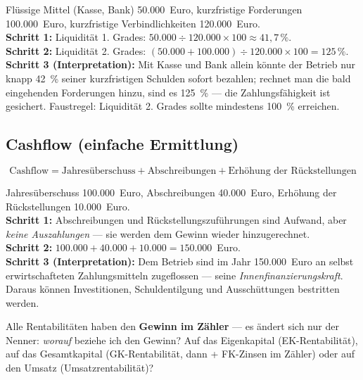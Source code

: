 \documentclass[11pt, a4paper]{article}
\begin{document}
\begin{beispiel}[title={Beispiel: Liquidität 1. und 2. Grades}]
Flüssige Mittel (Kasse, Bank) 50.000~Euro, kurzfristige Forderungen 100.000~Euro,
kurzfristige Verbindlichkeiten 120.000~Euro.\\
\textbf{Schritt 1:} Liquidität 1. Grades: $50.000 \div 120.000 \times 100
\approx 41{,}7\,\%$.\\
\textbf{Schritt 2:} Liquidität 2. Grades: $(50.000 + 100.000) \div 120.000 \times 100
= 125\,\%$.\\
\textbf{Schritt 3 (Interpretation):} Mit Kasse und Bank allein könnte der Betrieb nur
knapp 42~\% seiner kurzfristigen Schulden sofort bezahlen; rechnet man die bald
eingehenden Forderungen hinzu, sind es 125~\% --- die Zahlungsfähigkeit ist gesichert.
Faustregel: Liquidität 2. Grades sollte mindestens 100~\% erreichen.
\end{beispiel}

\subsection{Cashflow (einfache Ermittlung)}

\[
\mbox{Cashflow} = \mbox{Jahresüberschuss} + \mbox{Abschreibungen}
+ \mbox{Erhöhung der Rückstellungen}
\]

\begin{beispiel}[title={Beispiel: Cashflow}]
Jahresüberschuss 100.000~Euro, Abschreibungen 40.000~Euro, Erhöhung der Rückstellungen
10.000~Euro.\\
\textbf{Schritt 1:} Abschreibungen und Rückstellungszuführungen sind Aufwand, aber
\emph{keine Auszahlungen} --- sie werden dem Gewinn wieder hinzugerechnet.\\
\textbf{Schritt 2:} $100.000 + 40.000 + 10.000 = 150.000$~Euro.\\
\textbf{Schritt 3 (Interpretation):} Dem Betrieb sind im Jahr 150.000~Euro an
selbst erwirtschafteten Zahlungsmitteln zugeflossen --- seine
\emph{Innenfinanzierungskraft}. Daraus können Investitionen, Schuldentilgung und
Ausschüttungen bestritten werden.
\end{beispiel}

\begin{merksatz}[title={\bfseries Merkhilfe zu den Rentabilitäten}]
Alle Rentabilitäten haben den \textbf{Gewinn im Zähler} --- es ändert sich nur der
Nenner: \emph{worauf} beziehe ich den Gewinn? Auf das Eigenkapital
(EK-Rentabilität), auf das Gesamtkapital (GK-Rentabilität, dann + FK-Zinsen im
Zähler) oder auf den Umsatz (Umsatzrentabilität)?
\end{merksatz}
\end{document}
